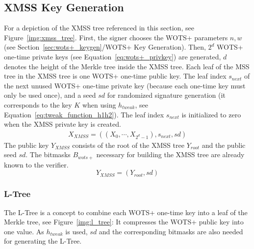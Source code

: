 \subsection{XMSS Key Generation}
For a depiction of the XMSS tree referenced in this section, see Figure~\ref{img:xmss_tree}. 
First, the signer chooses the WOTS+ parameters $n, w$ (see Section~\ref{sec:wots+_keygen}/WOTS+ Key Generation).
Then, $2^d$ WOTS+ one-time private keys (see Equation~\ref{eq:wots+_privkey}) are generated, $d$ denotes the height of the Merkle tree inside the XMSS tree. %
Each leaf of the MSS tree in the XMSS tree is one WOTS+ one-time public key. 
The leaf index $s_{next}$ of the next unused WOTS+ one-time private key (because each one-time key must only be used once), and a seed $sd$ for randomized signature generation (it corresponds to the key $K$ when using $h_{tweak}$, see Equation~\ref{eq:tweak_function_h1h2}). The leaf index $s_{next}$ is initialized to zero when the XMSS private key is created.
\begin{align}
\label{eq:xmss_priv_key}
X_{XMSS} = ((X_0, \cdots, X_{2^d-1}), s_{next}, sd)
\end{align}
The public key $Y_{XMSS}$ consists of the root of the XMSS tree $Y_{root}$ and the public seed $sd$. The bitmasks $B_{wots+}$ necessary for building the XMSS tree are already known to the verifier.
\begin{equation}
\label{eq:xmss_pubkey}
Y_{XMSS} = (Y_{root}, sd)
\end{equation}

\subsubsection{L-Tree}
\label{sec:l_tree}
The L-Tree is a concept to combine each WOTS+ one-time key into a leaf of the Merkle tree, see Figure~\ref{img:l_tree}: It compresses the WOTS+ public key into one value. As $h_{tweak}$ is used, $sd$ and the corresponding bitmasks are also needed for generating the L-Tree.

